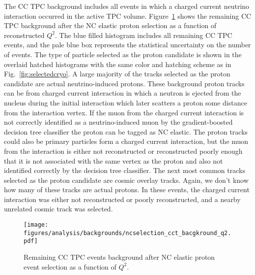     The CC TPC background includes all events in which a charged current
    neutrino interaction occurred in the active TPC volume.
    Figure~\ref{fig:selectedcctpc} shows the remaining CC TPC background after
    the NC elastic proton selection as a function of reconstructed $Q^2$. The
    blue filled histogram includes all remaining CC TPC events, and the pale
    blue box represents the statistical uncertainty on the number of events.
    The type of particle selected as the proton candidate is shown in the
    overlaid hatched histograms with the same color and hatching scheme as in
    Fig.~\ref{fig:selectedcryo}. A large majority of the tracks selected as the
    proton candidate are actual neutrino-induced protons. These background
    proton tracks can be from charged current interaction in which a neutron is
    ejected from the nucleus during the initial interaction which later
    scatters a proton some distance from the interaction vertex. If the muon
    from the charged current interaction is not correctly identified as a
    neutrino-induced muon by the gradient-boosted decision tree classifier the
    proton can be tagged as NC elastic. The proton tracks could also be primary
    particles form a charged current interaction, but the muon from the
    interaction is either not reconstructed or reconstructed poorly enough that
    it is not associated with the same vertex as the proton and also not
    identified correctly by the decision tree classifier. The next most common
    tracks selected as the proton candidate are cosmic overlay tracks. Again,
    we don't know how many of these tracks are actual protons. In these events,
    the charged current interaction was either not reconstructed or poorly
    reconstructed, and a nearby unrelated cosmic track was selected.
    \begin{figure}[ht]
      \centering
      \texttt{[image: figures/analysis/backgrounds/ncselection\_cct\_bacgkround\_q2.pdf]}
      \caption{Remaining CC TPC events background after NC elastic proton event
      selection as a function of $Q^2$.}
      \label{fig:selectedcctpc}
    \end{figure}


